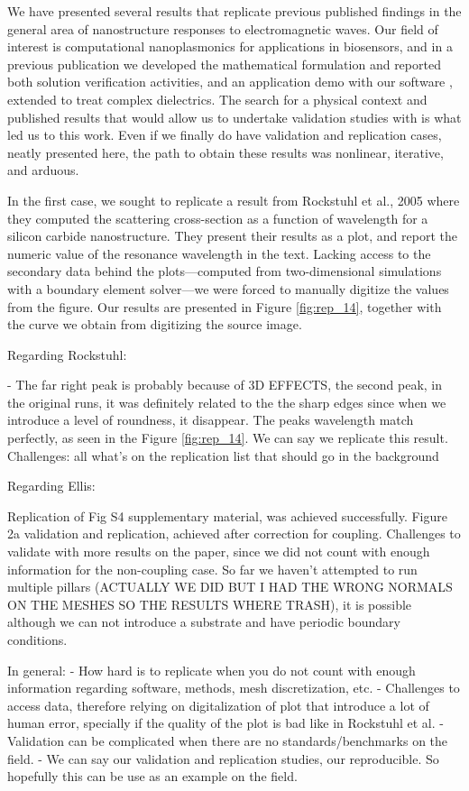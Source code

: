 
We have presented several results that replicate previous published findings in the general area of nanostructure responses to electromagnetic waves. 
Our field of interest is computational nanoplasmonics for applications in biosensors, and in a previous publication we developed the mathematical formulation and reported both solution verification activities, and an application demo with our software \pygbe, extended to treat complex dielectrics.
The search for a physical context and published results that would allow us to undertake validation studies with \pygbe is what led us to this work. 
Even if we finally do have validation and replication cases, neatly presented here, the path to obtain these results was nonlinear, iterative, and arduous.

In the first case, we sought to replicate a result from Rockstuhl et al., 2005 \cite{rockstuhl2005} where they computed the scattering cross-section as a function of wavelength for a silicon carbide nanostructure. 
They present their results as a plot, and report the numeric value of the resonance wavelength in the text. 
Lacking access to the secondary data behind the plots---computed from two-dimensional simulations with a boundary element solver---we were forced to manually digitize the values from the figure.
Our results are presented in Figure \ref{fig:rep_14}, together with the curve we obtain from digitizing the source image. 

Regarding Rockstuhl:

- The far right peak is probably because of 3D EFFECTS, the second peak, in the original runs, it was definitely related to the the 
sharp edges since when we introduce a level of roundness, it disappear. The peaks wavelength match perfectly, as seen in the Figure 
\ref{fig:rep_14}. We can say we replicate this result. 
Challenges: all what's on the replication list that should go in the background 

Regarding Ellis:

Replication of Fig S4 supplementary material, was achieved successfully. 
Figure 2a validation and replication, achieved after correction for coupling. 
Challenges to validate with more results on the paper, since we did not count with enough 
information for the non-coupling case. So far we haven't attempted to run multiple pillars 
(ACTUALLY WE DID BUT I HAD THE WRONG NORMALS ON THE MESHES SO THE RESULTS WHERE TRASH), it is possible although we can not
introduce a substrate and have periodic boundary conditions.  


In general:
- How hard is to replicate when you do not count with enough information regarding software, methods, mesh discretization, etc. 
- Challenges to access data, therefore relying on digitalization of plot that introduce a lot of human error, specially if the quality 
of the plot is bad like in Rockstuhl et al. 
- Validation can be complicated when there are no standards/benchmarks on the field.
- We can say our validation and replication studies, our reproducible. So hopefully this can be use as
 an example on the field. 